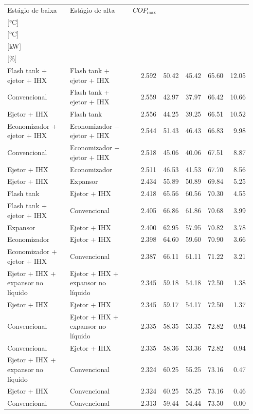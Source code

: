 {\small\setlength{\tabcolsep}{4pt}\renewcommand{\arraystretch}{1.12}
\begin{tabular}{llrrrrr}
\toprule
Estágio de baixa & Estágio de alta & $COP_{\max}$ & \shortstack{$T_{\mathrm{cond,l}}^*$\\{[°C]}} & \shortstack{$T_{\mathrm{evap,h}}^*$\\{[°C]}} & \shortstack{$\dot W_{\mathrm{liq}}$\\{[kW]}} & \shortstack{$\Delta COP_{\mathrm{opt}}$\\{[\%]}} \\
\midrule
Flash tank + ejetor + IHX & Flash tank + ejetor + IHX & 2.592 & 50.42 & 45.42 & 65.60 & 12.05 \\
Convencional & Flash tank + ejetor + IHX & 2.559 & 42.97 & 37.97 & 66.42 & 10.66 \\
Ejetor + IHX & Flash tank & 2.556 & 44.25 & 39.25 & 66.51 & 10.52 \\
Economizador + ejetor + IHX & Economizador + ejetor + IHX & 2.544 & 51.43 & 46.43 & 66.83 & 9.98 \\
Convencional & Economizador + ejetor + IHX & 2.518 & 45.06 & 40.06 & 67.51 & 8.87 \\
Ejetor + IHX & Economizador & 2.511 & 46.53 & 41.53 & 67.70 & 8.56 \\
Ejetor + IHX & Expansor & 2.434 & 55.89 & 50.89 & 69.84 & 5.25 \\
Flash tank & Ejetor + IHX & 2.418 & 65.56 & 60.56 & 70.30 & 4.55 \\
Flash tank + ejetor + IHX & Convencional & 2.405 & 66.86 & 61.86 & 70.68 & 3.99 \\
Expansor & Ejetor + IHX & 2.400 & 62.95 & 57.95 & 70.82 & 3.78 \\
Economizador & Ejetor + IHX & 2.398 & 64.60 & 59.60 & 70.90 & 3.66 \\
Economizador + ejetor + IHX & Convencional & 2.387 & 66.11 & 61.11 & 71.22 & 3.21 \\
Ejetor + IHX + expansor no líquido & Ejetor + IHX + expansor no líquido & 2.345 & 59.18 & 54.18 & 72.50 & 1.38 \\
Ejetor + IHX & Ejetor + IHX & 2.345 & 59.17 & 54.17 & 72.50 & 1.37 \\
Convencional & Ejetor + IHX + expansor no líquido & 2.335 & 58.35 & 53.35 & 72.82 & 0.94 \\
Convencional & Ejetor + IHX & 2.335 & 58.36 & 53.36 & 72.82 & 0.94 \\
Ejetor + IHX + expansor no líquido & Convencional & 2.324 & 60.25 & 55.25 & 73.16 & 0.47 \\
Ejetor + IHX & Convencional & 2.324 & 60.25 & 55.25 & 73.16 & 0.46 \\
Convencional & Convencional & 2.313 & 59.44 & 54.44 & 73.50 & 0.00 \\
\bottomrule
\end{tabular}
}
